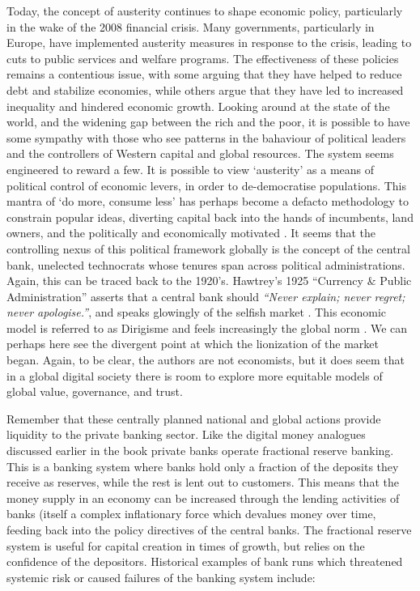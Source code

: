 Today, the concept of austerity continues to shape economic policy, particularly in the wake of the 2008 financial crisis. Many governments, particularly in Europe, have implemented austerity measures in response to the crisis, leading to cuts to public services and welfare programs. The effectiveness of these policies remains a contentious issue, with some arguing that they have helped to reduce debt and stabilize economies, while others argue that they have led to increased inequality and hindered economic growth. Looking around at the state of the world, and the widening gap between the rich and the poor, it is possible to have some sympathy with those who see patterns in the bahaviour of political leaders and the controllers of Western capital and global resources. The system seems engineered to reward a few. It is possible to view `austerity' as a means of political control of economic levers, in order to de-democratise populations. This mantra of `do more, consume less' has perhaps become a defacto methodology to constrain popular ideas, diverting capital back into the hands of incumbents, land owners, and the politically and economically motivated \cite{mattei2022capital}. It seems that the controlling nexus of this political framework globally is the concept of the central bank, unelected technocrats whose tenures span across political administrations. Again, this can be traced back to the 1920's. Hawtrey’s 1925 ``Currency \& Public Administration'' asserts that a central bank should \textit{``Never explain; never regret; never apologise.''}, and speaks glowingly of the selfish market \cite{hawtrey1925currency}. This economic model is referred to as Dirigisme and feels increasingly the global norm \cite{balassa2013theory}.  We can perhaps here see the divergent point at which the lionization of the market began. Again, to be clear, the authors are not economists, but it does seem that in a global digital society there is room to explore more equitable models of global value, governance, and trust.\par
Remember that these centrally planned national and global actions provide liquidity to the private banking sector. Like the digital money analogues discussed earlier in the book private banks operate fractional reserve banking. This is a banking system where banks hold only a fraction of the deposits they receive as reserves, while the rest is lent out to customers. This means that the money supply in an economy can be increased through the lending activities of banks (itself a complex inflationary force which devalues money over time, feeding back into the policy directives of the central banks. The fractional reserve system is useful for capital creation in times of growth, but relies on the confidence of the depositors. Historical examples of bank runs which threatened systemic risk or caused failures of the banking system include:
